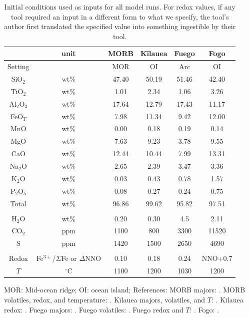 \begin{table}[!thbp]
    \centering
    \caption{Initial conditions used as inputs for all model runs. For redox values, if any tool required an input in a different form to what we specify, the tool's author first translated the specified value into something ingestible by their tool.}
    \begin{tabular}{cccccc}
        \toprule
        { } & {unit} & {MORB} & {Kīlauea} & {Fuego} & {Fogo} \\
        \midrule
        Setting & & MOR & OI & Arc & OI \\
        SiO$_2$ & wt\% & 47.40 & 50.19 & 51.46 & 42.40 \\ 
        TiO$_2$ & wt\% & 1.01 & 2.34 & 1.06 & 3.26 \\ 
        Al$_2$O$_3$ & wt\% & 17.64 & 12.79 & 17.43 & 11.17 \\ 
        FeO$_T$ & wt\% & 7.98 & 11.34 & 9.42 & 12.00 \\ 
        MnO & wt\% & 0.00 & 0.18 & 0.19 & 0.14 \\ 
        MgO & wt\% & 7.63 & 9.23 & 3.78 & 9.55 \\ 
        CaO & wt\% & 12.44 & 10.44 & 7.99 & 13.31 \\ 
        Na$_2$O & wt\% & 2.65 & 2.39 & 3.47 & 3.36 \\ 
        K$_2$O & wt\% & 0.03 & 0.43 & 0.78 & 1.57 \\ 
        P$_2$O$_5$ & wt\% & 0.08 & 0.27 & 0.24 & 0.75 \\ 
        Total & wt\% & 96.86 & 99.62 & 95.82 & 97.51 \\ 
        & & & & & \\
        H$_2$O & wt\% & 0.20 & 0.30 & 4.5 & 2.11 \\ 
        CO$_2$ & ppm & 1100 & 800 & 3300 & 11520 \\ 
        S & ppm & 1420 & 1500 & 2650 & 4690 \\
        & & & & & \\
        Redox & Fe$^{3+}$/$\Sigma$Fe or $\Delta$NNO & 0.10 & 0.18 & 0.24 & NNO+0.7 \\
        $T$ & $^{\circ}$C & 1100 & 1200 & 1030 & 1200 \\
    \bottomrule
    \end{tabular}
    \par\smallskip
    {\footnotesize{MOR: Mid-ocean ridge; OI: ocean island; References: MORB majors: \cite{Allan1989, GhiorsoGualda2015, WieserVESIcal2022}. MORB volatiles, redox, and temperature: \cite{cottrell2021morb}. Kīlauea majors, volatiles, and $T$: \cite{wieser2021reconstructing}. Kīlauea redox: \cite{lerner2021petrologic}. Fuego majors: \cite{rasmussen2020vapor, lloyd2013, moore2015bubbles, newcombe2020}. Fuego volatiles: \cite{rasmussen2020vapor}. Fuego redox and $T$: \cite{lloyd2013}. Fogo: \cite{devitre2023oceanic}.}}
    \label{table:basalt-compositions}
\end{table}